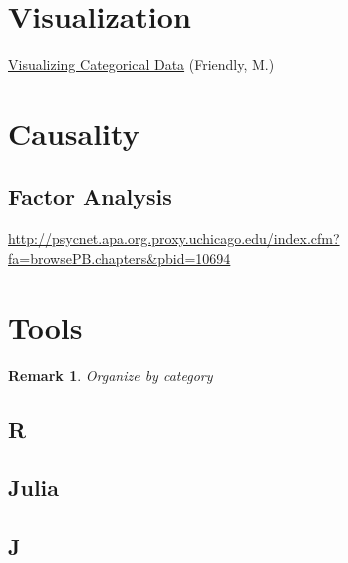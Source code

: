 \documentclass[reqno,12pt]{tufte-book}
\numberwithin{equation}{subsection}
\newtheorem{remark}{Remark}
\begin{document}
\part{Visualization}

\href{http://www.datavis.ca/books/vcd/}{Visualizing Categorical Data} (Friendly, M.)

\part{Causality}

\chapter{Factor Analysis}

\url{http://psycnet.apa.org.proxy.uchicago.edu/index.cfm?fa=browsePB.chapters&pbid=10694}

\part{Tools}

\begin{remark}
  Organize by category
\end{remark}

\chapter{R}

\chapter{Julia}

\chapter{J}
\end{document}
